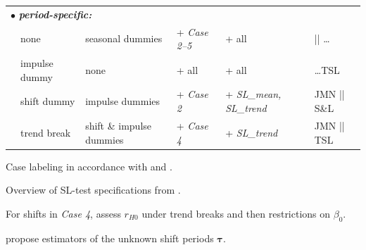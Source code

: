 \begin{threeparttable}
\begin{tabular}{lll|l||ll}
		\multicolumn{3}{l|}{$ \bullet $ \textit{\textbf{period-specific:}}} & & & \\
		& none & seasonal dummies & + \textit{Case 2--5}      & + all & \citet[p.~84]{Johansen1996} ||  \ldots \\
		& impulse dummy & none & + all & + all & \quad \ldots TSL \citeyearpar[p.~348]{TrenklerEtAl2008} \\
		& shift dummy    & impulse dummies	& + \textit{Case 2} \tnote{c)} & + \textit{SL\_mean, SL\_trend} & JMN \citeyearpar[Ch.~3.2]{JohansenEtAl2000} || S\&L \citeyearpar{SaikkonenLutkepohl2000b}\tnote{d)} \\
		& trend break    & shift \& impulse dummies	   & + \textit{Case 4} & + \textit{SL\_trend} & JMN \citeyearpar[Ch.~3.1]{JohansenEtAl2000} || TSL \citeyearpar{TrenklerEtAl2008} \\ \hline\hline
	\end{tabular}
	\begin{tablenotes}
		\item[a)] Case labeling in accordance with \citet[Ch.~6.3]{Juselius2006} and \citet[p.~193]{HlouskovaWagner2010}.
		\item[b)] Overview of SL-test specifications from \citet[p. 24, Tab. 1; p. 25, Tab. 2]{Trenkler2008}.
		\item[c)] For shifts in \textit{Case 4}, \citet[JMN,][Ch.~4]{JohansenEtAl2000} assess $ r_{H0} $ under trend breaks and then restrictions on $ \beta_{0} $. 
		\item[d)] \citet[TSL,][]{LutkepohlEtAl2004} propose estimators of the unknown shift periods $ \boldsymbol{\tau} $.
	\end{tablenotes}
\end{threeparttable}


